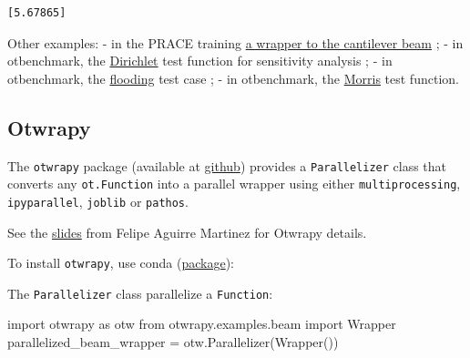 \documentclass[11pt]{article}
\newenvironment{Shaded}{}{}
\newcommand{\NormalTok}[1]{{#1}}
\newcommand{\ImportTok}[1]{{#1}}
\newcommand{\OperatorTok}[1]{\textcolor[rgb]{0.40,0.40,0.40}{{#1}}}
\newcommand{\ExtensionTok}[1]{{#1}}
\newcommand{\AttributeTok}[1]{\textcolor[rgb]{0.49,0.56,0.16}{{#1}}}
\begin{document}
    \begin{Verbatim}[commandchars=\\\{\}]
[5.67865]
    \end{Verbatim}

    Other examples: - in the PRACE training
\href{https://github.com/mbaudin47/hpcuqtraining/blob/773ddaed56339ddb548f82a2ff16bfcf5c00be2c/2019/Scripts/wrapper.py}{a
wrapper to the cantilever beam} ; - in otbenchmark, the
\href{https://github.com/mbaudin47/otbenchmark/blob/f33a9c6694cc0bb3e2680164519b82e9f2983977/otbenchmark/DirichletSensitivity.py}{Dirichlet}
test function for sensitivity analysis ; - in otbenchmark, the
\href{https://github.com/mbaudin47/otbenchmark/blob/f33a9c6694cc0bb3e2680164519b82e9f2983977/examples/scripts/testCrue-classeOTPFun.py}{flooding}
test case ; - in otbenchmark, the
\href{https://github.com/mbaudin47/otbenchmark/blob/f33a9c6694cc0bb3e2680164519b82e9f2983977/otbenchmark/MorrisSensitivity.py}{Morris}
test function.

    \hypertarget{otwrapy}{%
\subsection{Otwrapy}\label{otwrapy}}

The \texttt{otwrapy} package (available at
\href{https://github.com/openturns/otwrapy}{github}) provides a
\texttt{Parallelizer} class that converts any \texttt{ot.Function} into
a parallel wrapper using either \texttt{multiprocessing},
\texttt{ipyparallel}, \texttt{joblib} or \texttt{pathos}.

See the
\href{https://felipeam86.github.io/HPC-Uncertainties-PRACE/}{slides}
from Felipe Aguirre Martinez for Otwrapy details.

To install \texttt{otwrapy}, use conda
(\href{https://anaconda.org/conda-forge/otwrapy}{package}):

\begin{Shaded}
\end{Shaded}

The \texttt{Parallelizer} class parallelize a \texttt{Function}:

\begin{Shaded}
\begin{Highlighting}[]
\ImportTok{import}\NormalTok{ otwrapy }\ImportTok{as}\NormalTok{ otw}
\ImportTok{from}\NormalTok{ otwrapy.examples.beam }\ImportTok{import}\NormalTok{ Wrapper}
\NormalTok{parallelized\_beam\_wrapper }\OperatorTok{=}\NormalTok{ otw.Parallelizer(Wrapper())}
\end{Highlighting}
\end{Shaded}
\end{document}

